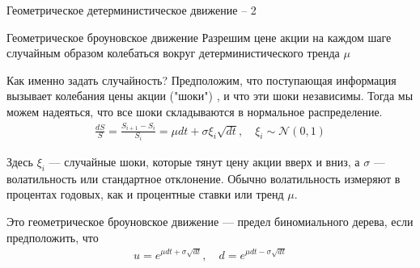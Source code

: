 \documentclass{beamer}
\begin{document}
\begin{frame}{Геометрическое детерминистическое движение -- 2}
\centering
{}
\end{frame}



\begin{frame}{Геометрическое броуновское движение}
\justify
Разрешим цене акции на каждом шаге случайным образом колебаться вокруг детерминистического тренда $\mu$

\justify
Как именно задать случайность? Предположим, что поступающая информация вызывает колебания цены акции ("шоки") , и что эти шоки независимы. Тогда мы можем надеяться, что все шоки складываются в нормальное распределение.
\begin{align*}
\frac{dS}{S} = \frac{S_{i+1} - S_i}{S_i} = \mu dt + \sigma\xi_i\sqrt{dt}, \quad \xi_i \sim \mathcal{N}(0, 1)
\end{align*}

\justify
Здесь $\xi_i$ --- случайные шоки, которые тянут цену акции вверх и вниз, а $\sigma$ --- волатильность или стандартное отклонение. Обычно волатильность измеряют в процентах годовых, как и процентные ставки или тренд $\mu$. 

\justify
Это геометрическое броуновское движение --- предел биномиального дерева, если предположить, что
\begin{align*}
u = e^{\mu dt + \sigma\sqrt{dt}}, \quad d = e^{\mu dt - \sigma\sqrt{dt}}
\end{align*}
\end{frame}



\newcommand{\plotBrownianMotion}[2] {
	
	\addplot[
		color = #2,
		mark = none,
		thick
	]
	table[
		x=t,
		y=s,
		col sep=comma
	]
	{#1};
	
	\addplot[
		color = #2,
		mark = none,
		thick,
		dashed,
		forget plot
	] 
	table[
		x=t,
		y=trend,
		col sep=comma
	]
	{#1};
}
\end{document}
